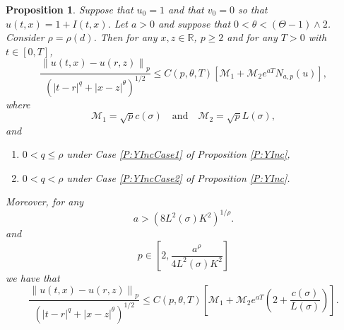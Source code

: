 \documentclass[a4paper,11pt]{article}
\numberwithin{equation}{section}
\theoremstyle{plain}
\newtheorem{proposition}[theorem]{Proposition}
\theoremstyle{definition}
\newcommand{\Norm}[1]{\left\|  #1   \right\|}
\newcommand{\R}{\mathbb{R}}
\numberwithin{NQ}{section}
\numberwithin{LQ}{section}
\numberwithin{ZQ}{section}
\begin{document}
	\begin{proposition}
		\label{P:NormInc}
		Suppose that $u_0=1$ and that $v_0 =0$ so that $u(t,x) = 1 + I(t,x)$. Let $a>0$ and suppose that $0< \theta < (\Theta -1) \wedge 2$. Consider $\rho = \rho(d)$. Then for any $x,z \in \R$, $p\ge 2$ and for any $T>0$ with $t\in [0,T]$,
		\begin{equation}
		\label{E:NormInc_N(u)}
		\frac{\Norm{u(t,x)-u(r,z)}_p}{\left(|t-r|^{q} + |x-z|^{\theta}\right)^{1/2}} \le 	C(p,\theta, T)\left[ \mathcal{M}_1 + \mathcal{M}_2 e^{aT} N_{a,p}(u)\right] ,
		\end{equation}
		where 
		\[
		\mathcal{M}_1 = \sqrt{p}c(\sigma) \quad \text{and} \quad\mathcal{M}_2 =\sqrt{p}L(\sigma),
		\]
		and
		\begin{enumerate}
			\item $0< q \le \rho$ under Case \ref{P:YIncCase1} of Proposition \ref{P:YInc},
			\item $0 < q < \rho$ under Case \ref{P:YIncCase2} of Proposition \ref{P:YInc}.
		\end{enumerate}
		Moreover, for any 
		\[
		a > \left( 8 L^2(\sigma)K^2\right)^{1/
			\rho}.
		\]
		and 
		\[
		p \in \left[ 2, \frac{a^{\rho}}{4L^2(\sigma)K^2} \right]
		\]
		we have that 
		\begin{equation}
		\label{E:NormInc_cL}
		\frac{\Norm{u(t,x)-u(r,z)}_p}{\left(|t-r|^{q} + |x-z|^{\theta}\right)^{1/2}} \le C(p,\theta, T)\left[ \mathcal{M}_1 + \mathcal{M}_2 e^{aT} \left( 2 +  \frac{c(\sigma)}{L(\sigma)} \right)\right].
		\end{equation}
	\end{proposition}
	
\end{document}
